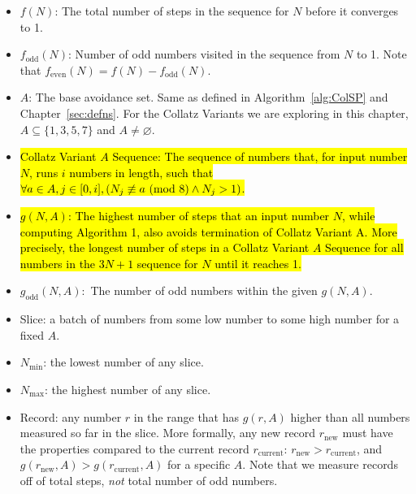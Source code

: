 \begin{itemize}
    \item $f(N)$: The total number of steps in the sequence for $N$ before it converges to 1.
    \item $f_\text{odd}(N)$: Number of odd numbers visited in the sequence from $N$ to 1. Note that $f_\text{even}(N) = f(N) - f_\text{odd}(N)$.
    \item $A$: The base avoidance set. Same as defined in Algorithm~\ref{alg:ColSP} and Chapter~\ref{sec:defns}. For the Collatz Variants we are exploring in this chapter, $A \subseteq \{1, 3, 5, 7\}$ and $A \ne \varnothing$.
    \item \hl{Collatz Variant $A$ Sequence: The sequence of numbers that, for input number $N$, runs $i$ numbers in length, such that $\forall a \in A, j \in [0, i], (N_j \not\equiv a \ (\mathrm{mod}\ 8) \wedge N_j > 1)$.}
    \item \hl{$g(N,A)$: The highest number of steps that an input number $N$, while computing Algorithm 1, also avoids termination of Collatz Variant A. More precisely, the longest number of steps in a Collatz Variant $A$ Sequence for all numbers in the $3N+1$ sequence for $N$ until it reaches 1.}
    \item $g_\text{odd}(N,A):$ The number of odd numbers within the given $g(N,A)$.
    \item Slice: a batch of numbers from some low number to some high number for a fixed $A$.
    \item $N_{\min}$: the lowest number of any slice.
    \item $N_{\max}$: the highest number of any slice.

    \item Record: any number $r$ in the range that has $g(r,A)$ higher than all numbers measured so far in the slice. More formally, any new record $r_\text{new}$ must have the properties compared to the current record $r_\text{current}$: $r_\text{new} > r_\text{current}$, and $g(r_\text{new},A) > g(r_\text{current},A)$ for a specific $A$. Note that we measure records off of total steps, \textit{not} total number of odd numbers.
      
\end{itemize}
